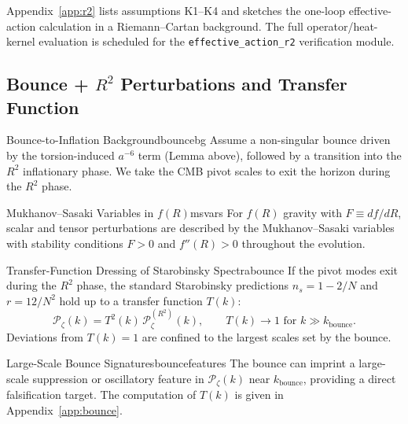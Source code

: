 \begin{tcolorbox}[colback=green!3, colframe=green!50!black, 
    title={\textbf{Derivation Provided (Conditional)}}, fonttitle=\bfseries\small]
Appendix~\ref{app:r2} lists assumptions K1--K4 and sketches the one-loop effective-action
calculation in a Riemann--Cartan background. The full operator/heat-kernel evaluation is
scheduled for the \texttt{effective\_action\_r2} verification module.
\end{tcolorbox}

\subsection{Bounce + $R^2$ Perturbations and Transfer Function}
\label{sec:bounce}

\begin{definition}{Bounce-to-Inflation Background}{bouncebg}
Assume a non-singular bounce driven by the torsion-induced $a^{-6}$ term
(Lemma above), followed by a transition into the $R^2$ inflationary phase.
We take the CMB pivot scales to exit the horizon during the $R^2$ phase.
\end{definition}

\begin{definition}{Mukhanov--Sasaki Variables in $f(R)$}{msvars}
For $f(R)$ gravity with $F \equiv df/dR$, scalar and tensor perturbations are
described by the Mukhanov--Sasaki variables with stability conditions
$F>0$ and $f''(R)>0$ throughout the evolution.
\end{definition}

\begin{theorem}{Transfer-Function Dressing of Starobinsky Spectra}{bounce}
If the pivot modes exit during the $R^2$ phase, the standard Starobinsky
predictions
$n_s = 1 - 2/N$ and $r = 12/N^2$ hold up to a transfer function $T(k)$:
\begin{equation}
    \mathcal{P}_\zeta(k) = T^2(k)\,\mathcal{P}_\zeta^{(R^2)}(k),
    \qquad T(k)\to 1 \text{ for } k \gg k_{\text{bounce}}.
\end{equation}
Deviations from $T(k)=1$ are confined to the largest scales set by the bounce.
\end{theorem}

\begin{corollary}{Large-Scale Bounce Signatures}{bouncefeatures}
The bounce can imprint a large-scale suppression or oscillatory feature in
$\mathcal{P}_\zeta(k)$ near $k_{\text{bounce}}$, providing a direct falsification
target. The computation of $T(k)$ is given in Appendix~\ref{app:bounce}.
\end{corollary}

